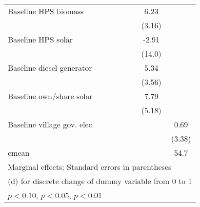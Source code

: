\begin{table}[htbp]
\begin{tabular*}{1\hsize}{@{\hskip\tabcolsep\extracolsep\fill}l*{6}{c}}
Baseline HPS biomass&                  &                  &                  &                  &     6.23\sym{*}  &                  \\
                &                  &                  &                  &                  &   (3.16)         &                  \\
Baseline HPS solar&                  &                  &                  &                  &    -2.91         &                  \\
                &                  &                  &                  &                  &   (14.0)         &                  \\
Baseline diesel generator&                  &                  &                  &                  &     5.34         &                  \\
                &                  &                  &                  &                  &   (3.56)         &                  \\
Baseline own/share solar&                  &                  &                  &                  &     7.79         &                  \\
                &                  &                  &                  &                  &   (5.18)         &                  \\
Baseline village gov. elec&                  &                  &                  &                  &                  &     0.69         \\
                &                  &                  &                  &                  &                  &   (3.38)         \\
\midrule
cmean           &                  &                  &                  &                  &                  &     54.7         \\
\bottomrule
\multicolumn{7}{l}{\footnotesize Marginal effects; Standard errors in parentheses}\\
\multicolumn{7}{l}{\footnotesize  (d) for discrete change of dummy variable from 0 to 1}\\
\multicolumn{7}{l}{\footnotesize \sym{*} \(p<0.10\), \sym{**} \(p<0.05\), \sym{***} \(p<0.01\)}\\
\end{tabular*}
\end{table}

